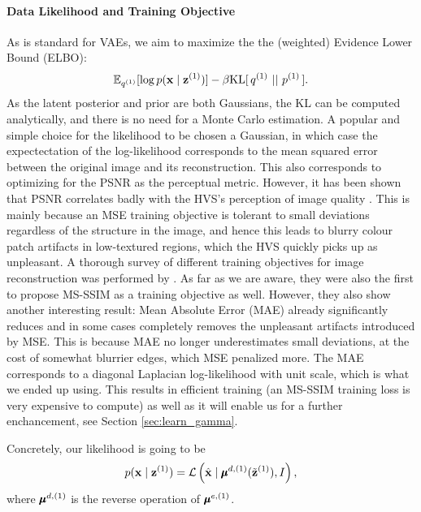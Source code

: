 \paragraph{Data Likelihood and Training Objective}
As is standard for VAEs, we aim to maximize the the (weighted) Evidence
Lower Bound (ELBO):
\begin{equation}
\label{eq:regular_vae_elbo}
\mathbb{E}_{q^{(1)}}[\log p(\mathbf{x} \mid \mathbf{z}^{(1)})] - \beta\mathrm{KL}[\,q^{(1)}\,\,||\,\,p^{(1)}\,].
\end{equation}
As the latent posterior and prior are both Gaussians, the KL can be computed
analytically, and there is no need for a Monte Carlo estimation. A popular and
simple choice for the likelihood to be chosen a Gaussian, in which case the
expectectation of the log-likelihood corresponds to the mean squared error
between the original image and its reconstruction. This also corresponds to
optimizing for the PSNR as the perceptual metric. However, it has been shown
that PSNR correlates badly with the HVS's perception of image quality \cite{girod1993s}
\cite{eskicioglu1994image}. This is mainly because an MSE training objective is
tolerant to small deviations regardless of the structure in the image, and hence
this leads to blurry colour patch artifacts in low-textured regions, which the
HVS quickly picks up as unpleasant. A thorough survey of different
training objectives for image reconstruction was performed by
\cite{zhao2015loss}. As far as we are aware, they were also the first to propose
MS-SSIM as a training objective as well. However, they also show another
interesting result: Mean Absolute Error (MAE) already significantly reduces and
in some cases completely removes the unpleasant artifacts introduced by MSE.
This is because MAE no longer underestimates small deviations, at the cost of
somewhat blurrier edges, which MSE penalized more. The MAE corresponds to a
diagonal Laplacian log-likelihood with unit scale, which is what we ended up
using. This results in
efficient training (an MS-SSIM training loss is very expensive to compute) as
well as it will enable us for a further enchancement, see Section
\ref{sec:learn_gamma}.

Concretely, our likelihood is going to be
\begin{equation}
\label{eq:laplace_likelihood}
  p(\mathbf{x} \mid \mathbf{z}^{(1)}) = \mathcal{L}\left( \hat{\mathbf{x}} \mid
  \pmb{\mu}^{d, (1)}(\tilde{\mathbf{z}}^{(1)}), I \right),
\end{equation}
where $\pmb{\mu}^{d, (1)}$ is the reverse operation of $\pmb{\mu}^{e, (1)}$.


